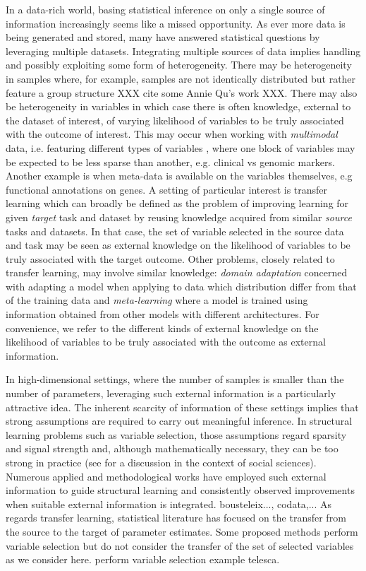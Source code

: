 \documentclass{article}
\begin{document}
In a data-rich world, basing statistical inference on only a single source of information increasingly seems like a missed opportunity. As ever more data is being generated and stored, many have answered statistical questions by 
leveraging multiple datasets. Integrating multiple sources of data implies handling and possibly exploiting some form of heterogeneity. There may be heterogeneity in samples where, for example, samples are not identically distributed but rather feature a group structure XXX cite some Annie Qu's work XXX. There may also be heterogeneity in variables in which case there is often knowledge, external to the dataset of interest, of varying likelihood of variables to be truly associated with the outcome of interest. This may occur when working with \textit{multimodal} data, i.e. featuring different types of variables \cite{}, where one block of variables may be expected to be less sparse than another, e.g. clinical vs genomic markers. Another example is when meta-data is available on the variables themselves, e.g functional annotations on genes. A setting of particular interest is transfer learning which %
can broadly be defined as the problem of improving learning for given \textit{target} task and dataset by reusing knowledge acquired from similar \textit{source} tasks and datasets. In that case, the set of variable selected in the source data and task may be seen as external knowledge on the likelihood of variables to be truly associated with the target outcome. Other problems, closely related to transfer learning, may involve similar knowledge:
\textit{domain adaptation} concerned with adapting a model when applying to data which distribution differ from that of the training data and \textit{meta-learning} where a model is trained using information obtained
from other models with different architectures. For convenience, we refer to the different kinds of external knowledge on the likelihood of variables to be truly associated with the outcome as external information.   

In high-dimensional settings, where the number of samples is smaller than the number of parameters, leveraging such 
external information is a particularly attractive idea. The inherent scarcity of information of these settings implies that strong assumptions are required to carry out meaningful inference. In structural learning problems such as variable selection, those assumptions regard sparsity and signal strength and, although mathematically necessary, they can be too strong in practice 
(see \citep{giannone2021economic} for a discussion in the context of social sciences). Numerous applied and methodological works have employed such external information to guide structural learning and consistently observed improvements when suitable external information is integrated. bousteleix..., codata,... As regards transfer learning, statistical literature has focused on the transfer from the source to the target of parameter estimates. Some proposed methods perform variable selection but do not consider the transfer of the set of selected variables as we consider here.  perform variable selection example telesca.
\end{document}
